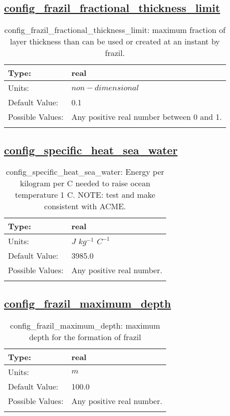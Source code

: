 \subsection[config\_frazil\_fractional\_thickness\_limit]{\hyperref[sec:nm_tab_frazil_ice]{config\_frazil\_fractional\_thickness\_limit}}
\label{subsec:nm_sec_config_frazil_fractional_thickness_limit}
\begin{center}
\begin{longtable}{| p{2.0in} || p{4.0in} |}
    \hline
    Type: & real \\
    \hline
    Units: & $non-dimensional$ \\
    \hline
    Default Value: & 0.1 \\
    \hline
    Possible Values: & Any positive real number between 0 and 1. \\
    \hline
    \caption{config\_frazil\_fractional\_thickness\_limit: maximum fraction of layer thickness than can be used or created at an instant by frazil.}
\end{longtable}
\end{center}
\subsection[config\_specific\_heat\_sea\_water]{\hyperref[sec:nm_tab_frazil_ice]{config\_specific\_heat\_sea\_water}}
\label{subsec:nm_sec_config_specific_heat_sea_water}
\begin{center}
\begin{longtable}{| p{2.0in} || p{4.0in} |}
    \hline
    Type: & real \\
    \hline
    Units: & $J$ $kg^{-1}$ $C^{-1}$ \\
    \hline
    Default Value: & 3985.0 \\
    \hline
    Possible Values: & Any positive real number. \\
    \hline
    \caption{config\_specific\_heat\_sea\_water: Energy per kilogram per C needed to raise ocean temperature 1 C. NOTE: test and make consistent with ACME.}
\end{longtable}
\end{center}
\subsection[config\_frazil\_maximum\_depth]{\hyperref[sec:nm_tab_frazil_ice]{config\_frazil\_maximum\_depth}}
\label{subsec:nm_sec_config_frazil_maximum_depth}
\begin{center}
\begin{longtable}{| p{2.0in} || p{4.0in} |}
    \hline
    Type: & real \\
    \hline
    Units: & $m$ \\
    \hline
    Default Value: & 100.0 \\
    \hline
    Possible Values: & Any positive real number. \\
    \hline
    \caption{config\_frazil\_maximum\_depth: maximum depth for the formation of frazil}
\end{longtable}
\end{center}

